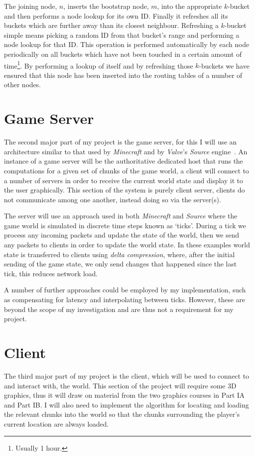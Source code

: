 \documentclass[12pt,notitlepage,a4paper]{report}
\newcommand{\K}{$k$}
\begin{document}
	The joining node, $n$, inserts the bootstrap node, $m$, into the appropriate \K-bucket and then performs a node lookup for its own ID. Finally it refreshes all its buckets which are further away than its closest neighbour. Refreshing a \K-bucket simple means picking a random ID from that bucket's range and performing a node lookup for that ID. This operation is performed automatically by each node periodically on all buckets which have not been touched in a certain amount of time\footnote{Usually 1 hour.}. By performing a lookup of itself and by refreshing those \K-buckets we have ensured that this node has been inserted into the routing tables of a number of other nodes.
	
	\section{Game Server}
	The second major part of my project is the game server, for this I will use an architecture similar to that used by \emph{Minecraft} and by \emph{Valve}'s \emph{Source} engine~\cite{source}. An instance of a game server will be the authoritative dedicated host that runs the computations for a given set of chunks of the game world, a client will connect to a number of servers in order to receive the current world state and display it to the user graphically. This section of the system is purely client server, clients do not communicate among one another, instead doing so via the server(s).
	
	The server will use an approach used in both \emph{Minecraft} and \emph{Source} where the game world is simulated in discrete time steps known as `ticks'. During a tick we process any incoming packets and update the state of the world, then we send any packets to clients in order to update the world state. In these examples world state is transferred to clients using \emph{delta compression}, where, after the initial sending of the game state, we only send changes that happened since the last tick, this reduces network load.
	
	A number of further approaches could be employed by my implementation, such as compensating for latency and interpolating between ticks. However, these are beyond the scope of my investigation and are thus not a requirement for my project.

	\section{Client}
	The third major part of my project is the client, which will be used to connect to and interact with, the world. This section of the project will require some 3D graphics, thus it will draw on material from the two graphics courses in Part IA and Part IB. I will also need to implement the algorithm for locating and loading the relevant chunks into the world so that the chunks surrounding the player's current location are always loaded.
	
\end{document}

